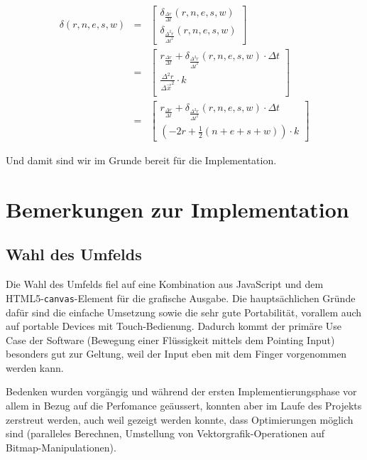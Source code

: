 \documentclass[11pt]{report} %
\theoremstyle{definition}
\begin{document}
\begin{eqnarray*}
\delta(r, n, e, s, w) &=& \begin{bmatrix}
	\delta_{\frac {\Delta r}{\Delta t}}(r,n,e,s,w) \\
	\delta_{\frac {\Delta^2 r}{\Delta t^2}}(r,n,e,s,w)
\end{bmatrix} \\
&=& \begin{bmatrix}
	r_{\frac {\Delta r}{\Delta t}} + \delta_{\frac {\Delta^2 r}{\Delta t^2}}(r,n,e,s,w)  \cdot \Delta t \\
	\frac{\Delta^2 r}{\Delta \vec x^2} \cdot k  \\
\end{bmatrix} \\
&=& \begin{bmatrix}
	r_{\frac {\Delta r}{\Delta t}} + \delta_{\frac {\Delta^2 r}{\Delta t^2}}(r,n,e,s,w)  \cdot \Delta t \\
	(-2 r + \frac 1 2 (n + e + s + w)) \cdot k
\end{bmatrix}
\end{eqnarray*}

Und damit sind wir im Grunde bereit für die Implementation.

\chapter{Bemerkungen zur Implementation}

\section{Wahl des Umfelds}

Die Wahl des Umfelds fiel auf eine Kombination aus JavaScript und dem HTML5-{\tt canvas}-Element für die grafische Ausgabe. Die hauptsächlichen Gründe dafür sind die einfache Umsetzung sowie die sehr gute Portabilität, vorallem auch auf portable Devices mit Touch-Bedienung. Dadurch kommt der primäre Use Case der Software (Bewegung einer Flüssigkeit mittels dem Pointing Input) besonders gut zur Geltung, weil der Input eben mit dem Finger vorgenommen werden kann.

Bedenken wurden vorgängig und während der ersten Implementierungsphase vor allem in Bezug auf die Perfomance geäussert, konnten aber im Laufe des Projekts zerstreut werden, auch weil gezeigt werden konnte, dass Optimierungen möglich sind (paralleles Berechnen, Umstellung von Vektorgrafik-Operationen auf Bitmap-Manipulationen).
\end{document}
